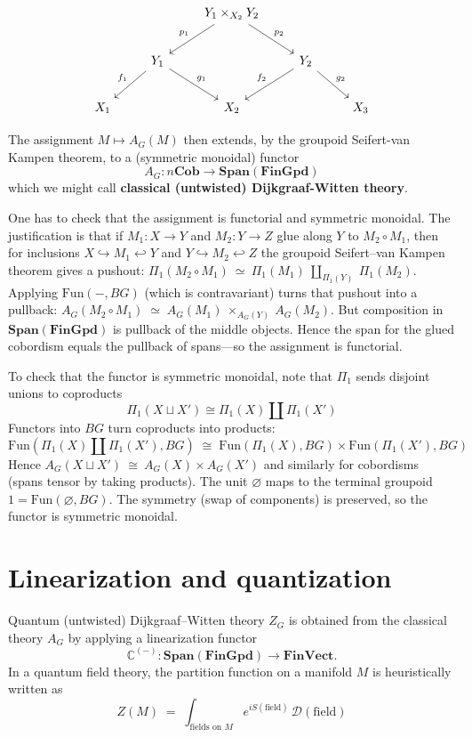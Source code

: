 \documentclass[12pt]{article}
\begin{document}
\begin{equation}\label{eq:pullback-span}
    \begin{tikzcd}[row sep=2.2em, column sep=2.4em]
        & & Y_1 \times_{X_2} Y_2 \arrow[ld, "p_1"'] \arrow[rd, "p_2"] & & \\
        & Y_1 \arrow[ld, "f_1"'] \arrow[rd, "g_1"] & & Y_2 \arrow[ld, "f_2"'] \arrow[rd, "g_2"] & \\
        X_1 & & X_2 & & X_3
    \end{tikzcd}
\end{equation}

The assignment $M \mapsto A_G(M)$ then extends, by the groupoid Seifert-van Kampen theorem, to a (symmetric monoidal) functor
\begin{equation} \label{eq:AG-functor-extended}
    A_G : n\mathbf{Cob} \to \mathbf{Span}(\mathbf{FinGpd})
\end{equation}
which we might call \textbf{classical (untwisted) Dijkgraaf-Witten theory}.

One has to check that the assignment is functorial and symmetric monoidal. The justification is that if $M_1:X\to Y$ and $M_2:Y\to Z$ glue along $Y$ to $M_2\circ M_1$, then for inclusions $X\hookrightarrow M_1\hookleftarrow Y$ and $Y\hookrightarrow M_2\hookleftarrow Z$ the groupoid Seifert--van Kampen theorem gives a pushout:
$\Pi_1(M_2\circ M_1)\ \simeq\ \Pi_1(M_1)\ \amalg_{\Pi_1(Y)}\ \Pi_1(M_2)$.
Applying $\mathrm{Fun}(-,BG)$ (which is contravariant) turns that pushout into a pullback:
$A_G(M_2\circ M_1)
    \;\simeq\;
    A_G(M_1)\ \times_{A_G(Y)}\ A_G(M_2)$.
But composition in $\mathbf{Span}(\mathbf{FinGpd})$ is pullback of the middle objects. Hence the span for the glued cobordism equals the pullback of spans—so the assignment is functorial.

To check that the functor is symmetric monoidal, note that $\Pi_1$ sends disjoint unions to coproducts
\[\Pi_1(X\sqcup X')\cong \Pi_1(X)\amalg \Pi_1(X')\]
Functors into $BG$ turn coproducts into products:
\[\mathrm{Fun}(\Pi_1(X)\amalg \Pi_1(X'),BG)
    \;\cong\;
    \mathrm{Fun}(\Pi_1(X),BG)\times \mathrm{Fun}(\Pi_1(X'),BG)\]
Hence $A_G(X\sqcup X')\ \cong\ A_G(X)\times A_G(X')$ and similarly for cobordisms (spans tensor by taking products). The unit $\varnothing$ maps to the terminal groupoid $1=\mathrm{Fun}(\varnothing,BG)$. The symmetry (swap of components) is preserved, so the functor is symmetric monoidal.

\section{Linearization and quantization}
Quantum (untwisted) Dijkgraaf–Witten theory $Z_G$ is obtained from the classical theory $A_G$ by applying a linearization functor
\[
    \mathbb{C}^{(-)} : \mathbf{Span}(\mathbf{FinGpd}) \to \mathbf{FinVect}.
\]
    In a quantum field theory, the partition function on a manifold $M$ is heuristically written as
    \[Z(M) \;=\; \int_{\text{fields on }M} e^{iS(\text{field})}\, \mathcal{D}(\text{field})\]
\end{document}
